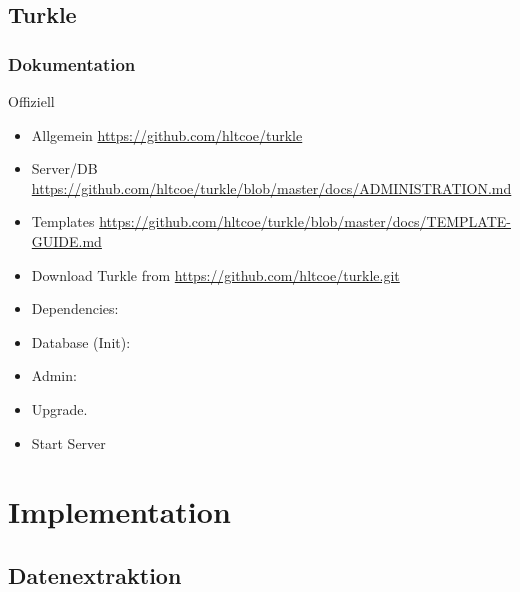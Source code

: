 \subsection{Turkle}

\subsubsection{Dokumentation}
Offiziell

\begin{itemize}
\item Allgemein
\url{https://github.com/hltcoe/turkle}

\item Server/DB
\url{https://github.com/hltcoe/turkle/blob/master/docs/ADMINISTRATION.md}

\item Templates
\url{https://github.com/hltcoe/turkle/blob/master/docs/TEMPLATE-GUIDE.md}
\end{itemize}



\begin{itemize}
\item
Download Turkle from
\url{https://github.com/hltcoe/turkle.git}

\item
Dependencies:

\item
Database (Init):

\item
Admin:

\item
Upgrade.

\item
Start Server

\end{itemize}














\newpage
\section{Implementation}

\subsection{Datenextraktion}

